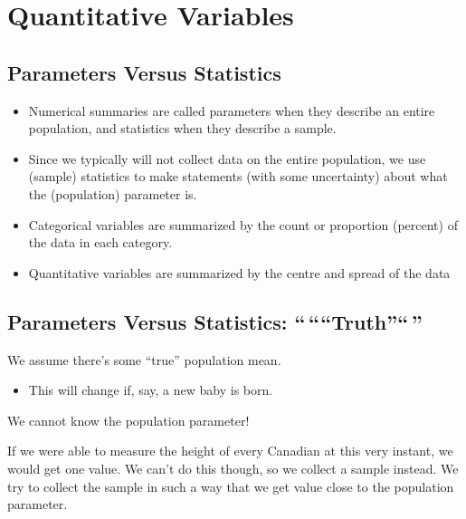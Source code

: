\documentclass[
  letterpaper,
  DIV=11,
  numbers=noendperiod,
  oneside]{scrreprt}
\providecommand{\tightlist}{%
  \setlength{\itemsep}{0pt}\setlength{\parskip}{0pt}}\usepackage{longtable,booktabs,array}
\begin{document}
\hypertarget{quantitative-variables-1}{%
\section{Quantitative Variables}\label{quantitative-variables-1}}

\hypertarget{parameters-versus-statistics}{%
\subsection{Parameters Versus
Statistics}\label{parameters-versus-statistics}}

\begin{itemize}
\tightlist
\item
  Numerical summaries are called parameters when they describe an entire
  population, and statistics when they describe a sample.
\item
  Since we typically will not collect data on the entire population, we
  use (sample) statistics to make statements (with some uncertainty)
  about what the (population) parameter is.
\item
  Categorical variables are summarized by the count or proportion
  (percent) of the data in each category.
\item
  Quantitative variables are summarized by the centre and spread of the
  data
\end{itemize}

\hypertarget{parameters-versus-statistics-truth}{%
\subsection{\texorpdfstring{Parameters Versus Statistics:
``\,````Truth''``\,''}{Parameters Versus Statistics: ``\,``\,``Truth''\,``\,''}}\label{parameters-versus-statistics-truth}}

We assume there's some ``true'' population mean.

\begin{itemize}
\tightlist
\item
  This will change if, say, a new baby is born.
\end{itemize}

We cannot know the population parameter!

If we were able to measure the height of every Canadian at this very
instant, we would get one value. We can't do this though, so we collect
a sample instead. We try to collect the sample in such a way that we get
value close to the population parameter.
\end{document}
